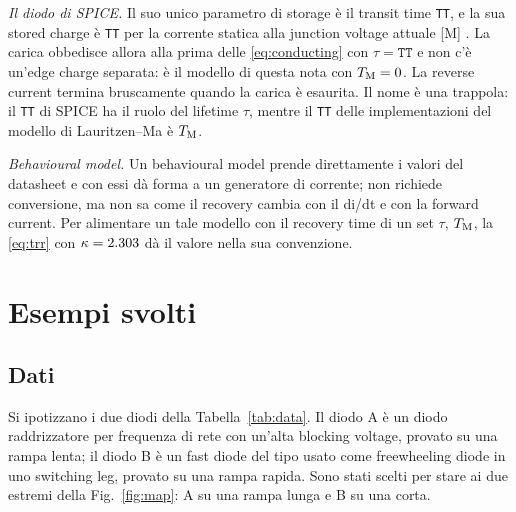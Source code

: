 \documentclass[10pt,a4paper]{scrartcl}
\let\newcommand\lmitdefine
\newcommand{\TM}{T_\mathrm{M}}
\begin{document}
\emph{Il diodo di SPICE.} Il suo unico parametro di storage è il transit time \texttt{TT}, e la sua stored charge è \texttt{TT} per la corrente statica alla junction voltage attuale [M] \cite{nagel1975}. La carica obbedisce allora alla prima delle \eqref{eq:conducting} con $\tau = \texttt{TT}$ e non c'è un'edge charge separata: è il modello di questa nota con $\TM = 0$. La reverse current termina bruscamente quando la carica è esaurita. Il nome è una trappola: il \texttt{TT} di SPICE ha il ruolo del lifetime $\tau$, mentre il \texttt{TT} delle implementazioni del modello di Lauritzen--Ma è $\TM$.

\emph{Behavioural model.} Un behavioural model prende direttamente i valori del datasheet e con essi dà forma a un generatore di corrente; non richiede conversione, ma non sa come il recovery cambia con il di/dt e con la forward current. Per alimentare un tale modello con il recovery time di un set $\tau$, $\TM$, la \eqref{eq:trr} con $\kappa = 2.303$ dà il valore nella sua convenzione.

\section{Esempi svolti}
\label{sec:examples}
\subsection{Dati}
Si ipotizzano i due diodi della Tabella~\ref{tab:data}. Il diodo A è un diodo raddrizzatore per frequenza di rete con un'alta blocking voltage, provato su una rampa lenta; il diodo B è un fast diode del tipo usato come freewheeling diode in uno switching leg, provato su una rampa rapida. Sono stati scelti per stare ai due estremi della Fig.~\ref{fig:map}: A su una rampa lunga e B su una corta.
\end{document}
